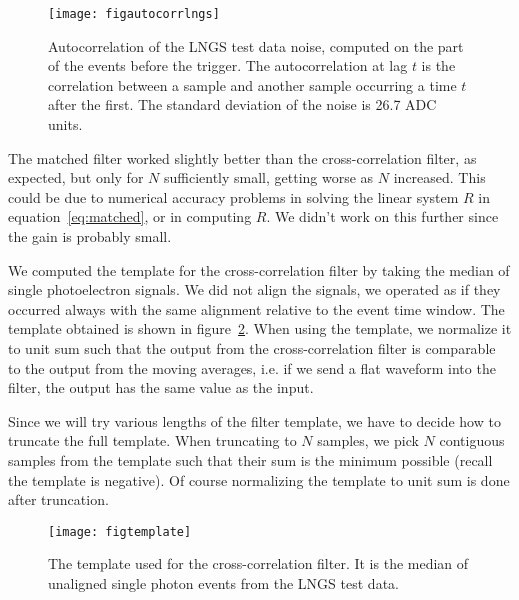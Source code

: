 \begin{figure}
    \hspace{0.00\textwidth}
    \texttt{[image: figautocorrlngs]}
    
    \caption{Autocorrelation of the LNGS test data noise, computed on the part
    of the events before the trigger. The autocorrelation at lag $t$ is the
    correlation between a sample and another sample occurring a time $t$ after
    the first. The standard deviation of the noise is 26.7 ADC units.}
    
    \label{fig:autocorrlngs}
\end{figure}

The matched filter worked slightly better than the cross-correlation filter, as
expected, but only for $N$ sufficiently small, getting worse as $N$ increased.
This could be due to numerical accuracy problems in solving the linear system
$R$ in equation~\ref{eq:matched}, or in computing $R$. We didn't work on this
further since the gain is probably small.

We computed the template for the cross-correlation filter by taking the median
of single photoelectron signals. We did not align the signals, we operated as
if they occurred always with the same alignment relative to the event time
window. The template obtained is shown in figure~\ref{fig:template}. When using
the template, we normalize it to unit sum such that the output from the
cross-correlation filter is comparable to the output from the moving averages,
i.e. if we send a flat waveform into the filter, the output has the same value
as the input.



Since we will try various lengths of the filter template, we have to decide how
to truncate the full template. When truncating to $N$ samples, we pick $N$
contiguous samples from the template such that their sum is the minimum
possible (recall the template is negative). Of course normalizing the template
to unit sum is done after truncation.

\begin{figure}
    \hspace{0.00\textwidth}
    \texttt{[image: figtemplate]}
    
    \caption{The template used for the cross-correlation filter. It is the
    median of unaligned single photon events from the LNGS test data.}
    
    \label{fig:template}
\end{figure}

